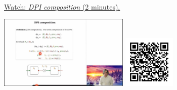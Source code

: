 
\begin{minipage}{10cm}
    \href{https://act4e-spring21.netlify.app/videos/spring2021-profunctors:dpi-comp.html}{Watch: \emph{DPI composition} (2 minutes).}
        
    \href{https://act4e-spring21.netlify.app/videos/spring2021-profunctors:dpi-comp.html}{\includegraphics[height=3.5cm]{spring2021-profunctors:dpi-comp/thumbnails.jpg}}
    \href{https://act4e-spring21.netlify.app/videos/spring2021-profunctors:dpi-comp.html}{\includegraphics[height=2.5cm]{spring2021-profunctors:dpi-comp/qrcode.png}}
\end{minipage}
